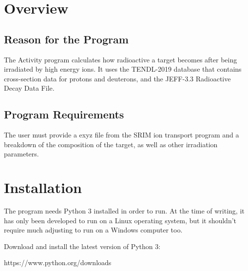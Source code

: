 \documentclass[12pt,twoside]{manual}
\begin{document}


\tableofcontents






\chapter{Overview}

\section{Reason for the Program}

The Activity program calculates how radioactive a target becomes after being irradiated by high energy ions.  It uses the TENDL-2019\cite{tendl2019} database that contains cross-section data for protons and deuterons, and the JEFF-3.3 Radioactive Decay Data File\cite{jeff33}.

\section{Program Requirements}

The user must provide a exyz file from the SRIM\cite{srim} ion transport program and a breakdown of the composition of the target, as well as other irradiation parameters.




\chapter{Installation}

The program needs Python 3 installed in order to run.  At the time of writing, it has only been developed to run on a Linux operating system, but it shouldn't require much adjusting to run on a Windows computer too.

Download and install the latest version of Python 3:

https://www.python.org/downloads
\end{document}

